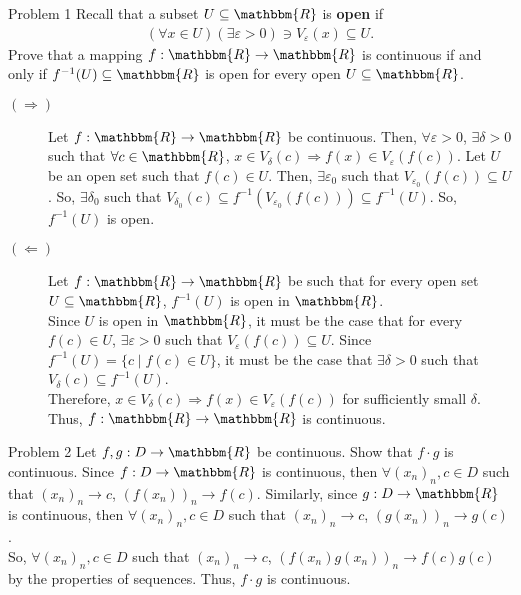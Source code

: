\documentclass[8pt]{extarticle}
\title{}
\author{}
\date{}
\newcommand{\R}{\mathbbm{R}}
\begin{document}
  \begin{problem}{Problem 1}
    Recall that a subset $U\subseteq \R$ is \textbf{open} if
    \begin{align*}
      (\forall x\in U)(\exists \varepsilon > 0) \ni V_{\varepsilon}(x) \subseteq U.
    \end{align*}
    Prove that a mapping $f: \R \rightarrow \R$ is continuous if and only if $f^{-1}(U) \subseteq \R$ is open for every open $U\subseteq \R$. 
    \tcblower
    \begin{description}
      \item[$(\Rightarrow)$] Let $f: \R \rightarrow \R$ be continuous. Then, $\forall \varepsilon > 0$, $\exists \delta > 0$ such that  $\forall c\in\R$, $x\in V_{\delta}(c) \Rightarrow f(x) \in V_{\varepsilon}(f(c))$. Let $U$ be an open set such that $f(c)\in U$. Then, $\exists \varepsilon_{0}$ such that $V_{\varepsilon_0}(f(c))\subseteq U$. So, $\exists \delta_0$ such that $V_{\delta_0}(c) \subseteq f^{-1}(V_{\varepsilon_0}(f(c)))\subseteq f^{-1}(U)$. So, $f^{-1}(U)$ is open.
      \item[$(\Leftarrow)$] Let $f: \R \rightarrow \R$ be such that for every open set $U\subseteq \R$, $f^{-1}(U)$ is open in $\R$.\\

        Since $U$ is open in $\R$, it must be the case that for every $f(c)\in U$, $\exists \varepsilon > 0$ such that $V_{\varepsilon}(f(c))\subseteq U$. Since $f^{-1}(U) = \{c\mid f(c)\in U\}$, it must be the case that $\exists \delta > 0$ such that $V_{\delta}(c) \subseteq f^{-1}(U)$.\\

        Therefore, $x\in V_{\delta}(c) \Rightarrow f(x)\in V_{\varepsilon}(f(c))$ for sufficiently small $\delta$. Thus, $f: \R \rightarrow \R$ is continuous.
    \end{description}
  \end{problem}
  \begin{problem}{Problem 2}
    Let $f,g: D\rightarrow \R$ be continuous. Show that $f\cdot g$ is continuous.
    \tcblower
    Since $f: D\rightarrow \R$ is continuous, then $\forall (x_n)_n,c\in D$ such that $(x_n)_n \rightarrow c$, $\left(f(x_n)\right)_n \rightarrow f(c)$. Similarly, since $g: D\rightarrow \R$ is continuous, then $\forall (x_n)_n,c\in D$ such that $(x_n)_n\rightarrow c$, $(g(x_n))_n \rightarrow g(c)$.\\

    So, $\forall (x_n)_n,c\in D$ such that $(x_n)_n \rightarrow c$, $(f(x_n)g(x_n))_n \rightarrow f(c)g(c)$ by the properties of sequences. Thus, $f\cdot g$ is continuous.
  \end{problem}
\end{document}
